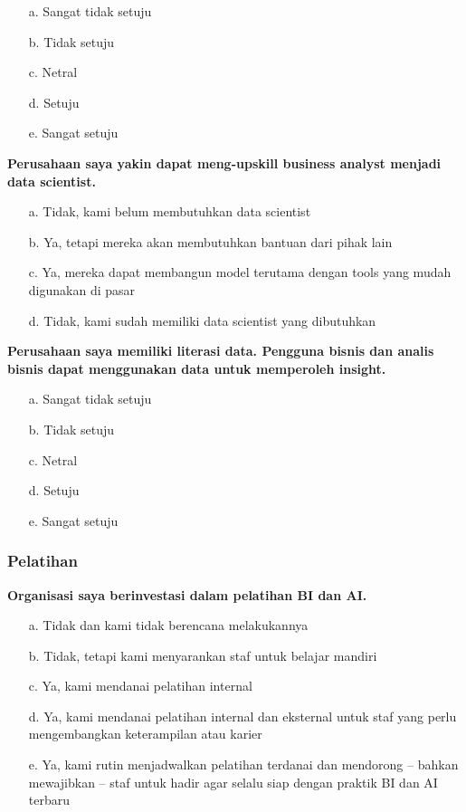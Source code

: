 \documentclass{article}
\begin{document}
\begin{enumerate}
	\item[a.] Sangat tidak setuju
	\item[b.] Tidak setuju
	\item[c.] Netral
	\item[d.] Setuju
	\item[e.] Sangat setuju
\end{enumerate}

\textbf{Perusahaan saya yakin dapat meng-upskill business analyst menjadi data scientist.}

\begin{enumerate}
	\item[a.] Tidak, kami belum membutuhkan data scientist
	\item[b.] Ya, tetapi mereka akan membutuhkan bantuan dari pihak lain
	\item[c.] Ya, mereka dapat membangun model terutama dengan tools yang mudah digunakan di pasar
	\item[d.] Tidak, kami sudah memiliki data scientist yang dibutuhkan
\end{enumerate}

\textbf{Perusahaan saya memiliki literasi data. Pengguna bisnis dan analis bisnis dapat menggunakan data untuk memperoleh insight.}

\begin{enumerate}
	\item[a.] Sangat tidak setuju
	\item[b.] Tidak setuju
	\item[c.] Netral
	\item[d.] Setuju
	\item[e.] Sangat setuju
\end{enumerate}

\subsubsection{Pelatihan}

\textbf{Organisasi saya berinvestasi dalam pelatihan BI dan AI.}

\begin{enumerate}
	\item[a.] Tidak dan kami tidak berencana melakukannya
	\item[b.] Tidak, tetapi kami menyarankan staf untuk belajar mandiri
	\item[c.] Ya, kami mendanai pelatihan internal
	\item[d.] Ya, kami mendanai pelatihan internal dan eksternal untuk staf yang perlu mengembangkan keterampilan atau karier
	\item[e.] Ya, kami rutin menjadwalkan pelatihan terdanai dan mendorong – bahkan mewajibkan – staf untuk hadir agar selalu siap dengan praktik BI dan AI terbaru
\end{enumerate}
\end{document}
